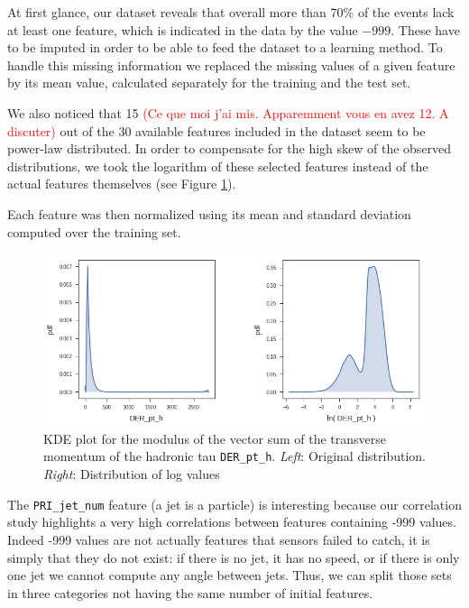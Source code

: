 \documentclass[10pt,conference,compsocconf]{IEEEtran}
\begin{document}
At first glance, our dataset reveals that overall more than 70\% of the events lack at least one feature, which is indicated in the data by the value $-999$. These have to be imputed in order to be able to feed the dataset to a learning method. To handle this missing information we replaced the missing values of a given feature by its mean value, calculated separately for the training and the test set.

We also noticed that 15 \textcolor{red}{(Ce que moi j'ai mis. Apparemment vous en avez 12. A discuter) } out of the 30 available features included in the dataset seem to be power-law distributed. In order to compensate for the high skew of the observed distributions, we took the logarithm of these selected features instead of the actual features themselves (see Figure \ref{fig_kde}).

Each feature was then normalized using its mean and standard deviation computed over the training set. 

\begin{figure}[htb]
\centering
\includegraphics[width=\linewidth]{kdeplot.png}

\cprotect\caption{KDE plot for the modulus of the vector sum of the transverse momentum of the hadronic tau \verb+DER_pt_h+.
\emph{Left}: Original distribution. \emph{Right}:  Distribution of log values}
\label{fig_kde}
\end{figure}


The \verb+PRI_jet_num+ feature (a jet is a particle) is interesting because our correlation study highlights a very high correlations between features containing -999 values. Indeed -999 values are not actually features that sensors failed to catch, it is simply that they do not exist: if there is no jet, it has no speed, or if there is only one jet we cannot compute any angle between jets. Thus, we can split those sets in three categories not having the same number of initial features.
\end{document}
